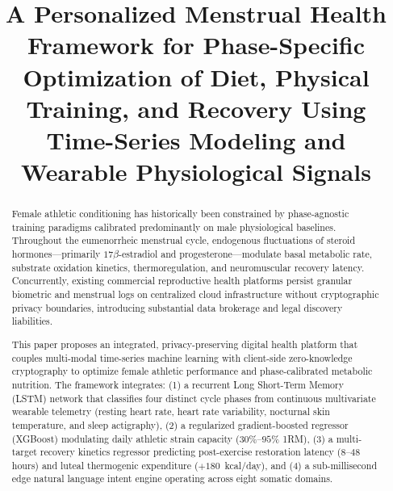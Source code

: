 \documentclass[conference]{IEEEtran}
\begin{document}
\title{A Personalized Menstrual Health Framework for Phase-Specific Optimization of Diet, Physical Training, and Recovery Using Time-Series Modeling and Wearable Physiological Signals}

\author{
}

\maketitle

\begin{abstract}
Female athletic conditioning has historically been constrained by phase-agnostic training paradigms calibrated predominantly on male physiological baselines. Throughout the eumenorrheic menstrual cycle, endogenous fluctuations of steroid hormones---primarily $17\beta$-estradiol and progesterone---modulate basal metabolic rate, substrate oxidation kinetics, thermoregulation, and neuromuscular recovery latency. Concurrently, existing commercial reproductive health platforms persist granular biometric and menstrual logs on centralized cloud infrastructure without cryptographic privacy boundaries, introducing substantial data brokerage and legal discovery liabilities.

This paper proposes an integrated, privacy-preserving digital health platform that couples multi-modal time-series machine learning with client-side zero-knowledge cryptography to optimize female athletic performance and phase-calibrated metabolic nutrition. The framework integrates: (1) a recurrent Long Short-Term Memory (LSTM) network that classifies four distinct cycle phases from continuous multivariate wearable telemetry (resting heart rate, heart rate variability, nocturnal skin temperature, and sleep actigraphy), (2) a regularized gradient-boosted regressor (XGBoost) modulating daily athletic strain capacity ($30\%$--$95\%$ 1RM), (3) a multi-target recovery kinetics regressor predicting post-exercise restoration latency ($8$--$48$ hours) and luteal thermogenic expenditure ($+180$~kcal/day), and (4) a sub-millisecond edge natural language intent engine operating across eight somatic domains.


\end{abstract}
\end{document}
